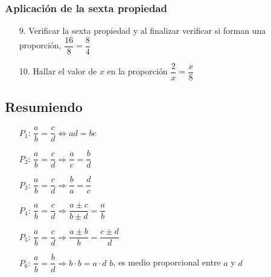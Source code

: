 \documentclass[10pt,twoside]{article}
\begin{document}
\subsubsection*{Aplicaci\'{o}n de la sexta propiedad}
\begin{enumerate}
\item[9.] Verificar la sexta propiedad y al finalizar verificar si forman una proporción, \quad $\dfrac{16}{8}=\dfrac{8}{4}$
\item[10.] \label{num:02} Hallar el valor de $x$ en la proporción \qquad $\dfrac{2}{x}=\dfrac{x}{8}$
\end{enumerate}
\subsection*{Resumiendo}
\begin{itemize}
\item[$P_{1}$:] $\dfrac{a}{b}=\dfrac{c}{d}\Leftrightarrow ad=bc$
\item[$P_{2}$:] $\dfrac{a}{b}=\dfrac{c}{d}\Rightarrow \dfrac{a}{c}=\dfrac{b}{d}$
\item[$P_{3}$:] $\dfrac{a}{b}=\dfrac{c}{d}\Rightarrow \dfrac{b}{a}=\dfrac{d}{c}$
\item[$P_{4}$:] $\dfrac{a}{b}=\dfrac{c}{d}\Rightarrow \dfrac{a\pm c}{b\pm d}=\dfrac{a}{b}$
\item[$P_{5}$:] $\dfrac{a}{b}=\dfrac{c}{d}\Rightarrow \dfrac{a\pm b}{b}=\dfrac{c\pm d}{d}$
\item[$P_{6}$:] $\dfrac{a}{b}=\dfrac{b}{d}\Rightarrow b\cdot b =a\cdot d$ \qquad $b$, es medio proporcional entre $a$ y $d$
\end{itemize}
\end{document}
